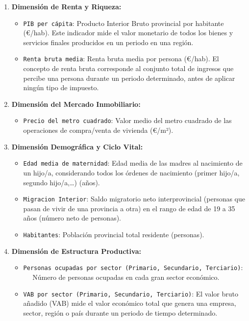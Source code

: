 \documentclass[,article,submit,moreauthors,pdftex]{Definitions/mdpi}
\providecommand{\tightlist}{%
  \setlength{\itemsep}{0pt}\setlength{\parskip}{0pt}}
\begin{document}
\begin{enumerate}
\def\labelenumi{\arabic{enumi}.}
\tightlist
\item
  \textbf{Dimensión de Renta y Riqueza:}

  \begin{itemize}
  \tightlist
  \item
    \texttt{PIB\ per\ cápita}: Producto Interior Bruto provincial por
    habitante (€/hab). Este indicador mide el valor monetario de todos
    los bienes y servicios finales producidos en un periodo en una
    región.
  \item
    \texttt{Renta\ bruta\ media}: Renta bruta media por persona (€/hab).
    El concepto de renta bruta corresponde al conjunto total de ingresos
    que percibe una persona durante un periodo determinado, antes de
    aplicar ningún tipo de impuesto.
  \end{itemize}
\item
  \textbf{Dimensión del Mercado Inmobiliario:}

  \begin{itemize}
  \tightlist
  \item
    \texttt{Precio\ del\ metro\ cuadrado}: Valor medio del metro
    cuadrado de las operaciones de compra/venta de vivienda (€/m²).
  \end{itemize}
\item
  \textbf{Dimensión Demográfica y Ciclo Vital:}

  \begin{itemize}
  \tightlist
  \item
    \texttt{Edad\ media\ de\ maternidad}: Edad media de las madres al
    nacimiento de un hijo/a, considerando todos los órdenes de
    nacimiento (primer hijo/a, segundo hijo/a,\ldots) (años).
  \item
    \texttt{Migracion\ Interior}: Saldo migratorio neto interprovincial
    (personas que pasan de vivir de una provincia a otra) en el rango de
    edad de 19 a 35 años (número neto de personas).
  \item
    \texttt{Habitantes}: Población provincial total residente
    (personas).
  \end{itemize}
\item
  \textbf{Dimensión de Estructura Productiva:}

  \begin{itemize}
  \tightlist
  \item
    \texttt{Personas\ ocupadas\ por\ sector\ (Primario,\ Secundario,\ Terciario)}:
    \(\quad\) Número de personas ocupadas en cada gran sector económico.
  \item
    \texttt{VAB\ por\ sector\ (Primario,\ Secundario,\ Terciario)}: El
    valor bruto añadido (VAB) mide el valor económico total que genera
    una empresa, sector, región o país durante un periodo de tiempo
    determinado.
  \end{itemize}
\end{enumerate}
\end{document}

